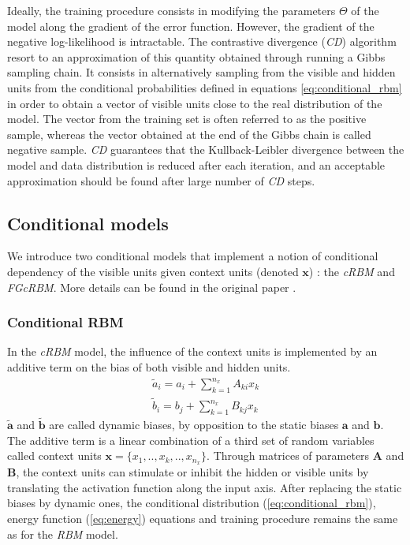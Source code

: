 \documentclass{article}
\begin{document}
Ideally, the training procedure consists in modifying the parameters $\Theta$ of the model along the gradient of the error function.
However, the gradient of the negative log-likelihood is intractable.
The contrastive divergence (\textit{CD}) algorithm \cite{Fischer2012,hinton2010practical} resort to an approximation of this quantity obtained through running a Gibbs sampling chain.
It consists in alternatively sampling from the visible and hidden units from the conditional probabilities defined in equations \ref{eq:conditional_rbm} in order to obtain a vector of visible units close to the real distribution of the model. The vector from the training set is often referred to as the positive sample, whereas the vector obtained at the end of the Gibbs chain is called negative sample.
\textit{CD} guarantees that the Kullback-Leibler divergence between the model and data distribution is reduced after each iteration\cite{hinton2002training}, and an acceptable approximation should be found after large number of \textit{CD} steps.

\subsection{Conditional models}
We introduce two conditional models that implement a notion of conditional dependency of the visible units given context units (denoted $\bm{x}$) :  the \textit{cRBM} and \textit{FGcRBM}. More details can be found in the original paper \cite{taylor2009factored}.

\subsubsection{Conditional RBM}
In the \textit{cRBM} model, the influence of the context units is implemented by an additive term on the bias of both visible and hidden units.
\begin{align}
\tilde{a}_i = a_i + \sum_{k=1}^{n_x} A_{ki} x_k\\
\tilde{b}_i = b_j + \sum_{k=1}^{n_x} B_{kj} x_k
\end{align}
$\tilde{\bm{a}}$ and $\tilde{\bm{b}}$ are called dynamic biases, by opposition to the static biases $\bm{a}$ and $\bm{b}$. The additive term is a linear combination of a third set of random variables called context units $\bm{x} = \{ x_1, .., x_k, .., x_{n_x} \}$.
Through matrices of parameters $\bm{A}$ and $\bm{B}$, the context units can stimulate or inhibit the hidden or visible units by translating the activation function along the input axis. After replacing the static biases by dynamic ones, the conditional distribution (\ref{eq:conditional_rbm}), energy function (\ref{eq:energy}) equations and training procedure remains the same as for the \textit{RBM} model.
\end{document}
